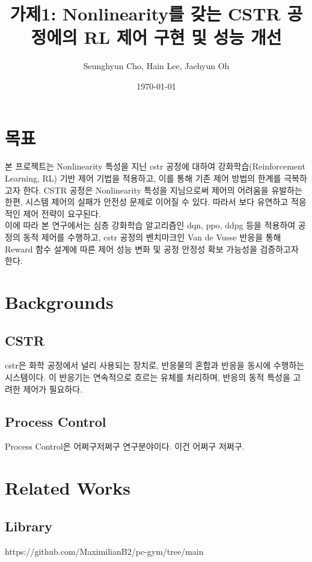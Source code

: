 \documentclass[11pt]{article}
\begin{document}
\title{가제1:  Nonlinearity를 갖는 CSTR 공정에의 RL 제어 구현 및 성능 개선}
\author{Seunghyun Cho, Hain Lee, Jaehyun Oh}
\date{\today}
\maketitle

 


\section{목표}
본 프로젝트는 Nonlinearity 특성을 지닌 \gls{cstr} 공정에 대하여 강화학습(Reinforcement Learning, RL) 기반 제어 기법을 적용하고, 이를 통해 기존 제어 방법의 한계를 극복하고자 한다.
CSTR 공정은 Nonlinearity 특성을 지님으로써 제어의 어려움을 유발하는 한편, 시스템 제어의 실패가 안전성 문제로 이어질 수 있다. 
따라서 보다 유연하고 적응적인 제어 전략이 요구된다.\\
이에 따라 본 연구에서는 심층 강화학습 알고리즘인 \gls{dqn}, \gls{ppo}, \gls{ddpg} 등을 적용하여 공정의 동적 제어를 수행하고,
\gls{cstr} 공정의 벤치마크인 Van de Vusse 반응을 통해 Reward 함수 설계에 따른 제어 성능 변화 및 공정 안정성 확보 가능성을 검증하고자 한다.


\section{Backgrounds}
\subsection{CSTR}
\gls{cstr}은 화학 공정에서 널리 사용되는 장치로, 반응물의 혼합과 반응을 동시에 수행하는 시스템이다.
이 반응기는 연속적으로 흐르는 유체를 처리하며, 반응의 동적 특성을 고려한 제어가 필요하다. 


\subsection{Process Control}
Process Control은 어쩌구저쩌구 연구분야이다. 이건 어쩌구 저쩌구.


\section{Related Works}

\subsection{Library}
https://github.com/MaximilianB2/pc-gym/tree/main
\end{document}

